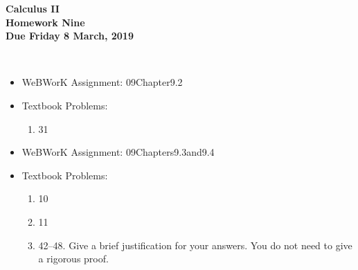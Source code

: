 \documentclass[12pt]{article}
\begin{document}
\pagestyle{empty}
 
\begin{center}
{\large {\bf Calculus II}}\\
\medskip
{\large {\bf Homework Nine}}\\
\medskip
{ {\bf Due Friday 8 March, 2019}}\\
\end{center}



 \\ 



\begin{itemize}
\setlength{\itemsep}{0mm}
\item WeBWorK Assignment: 09Chapter9.2
\item Textbook Problems:
  \begin{enumerate}
  \setlength{\itemsep}{-1mm}
     \item 31
  \end{enumerate}
\end{itemize}


\begin{itemize}
\setlength{\itemsep}{0mm}
\item WeBWorK Assignment: 09Chapters9.3and9.4
\item Textbook Problems:
  \begin{enumerate}
  \setlength{\itemsep}{-1mm}
     \item 10
     \item 11
     \item 42--48. Give a brief justification for your answers.  You
       do not need to give a rigorous proof.  %
  \end{enumerate}
\end{itemize}
\end{document}
